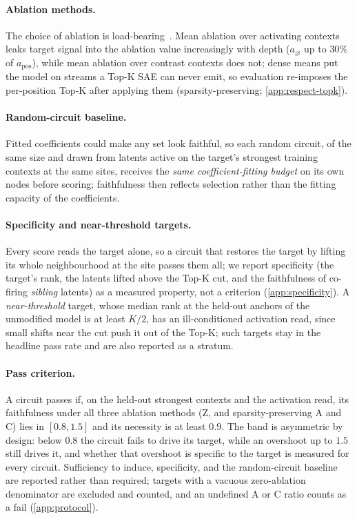 \documentclass[10pt]{article}
\begin{document}
\paragraph{Ablation methods.}
The choice of ablation is load-bearing~\citep{li2024optimal, miller2024transformer}.
Mean ablation over activating contexts leaks target signal into the ablation value increasingly with depth ($a_{\varnothing}$ up to $30\%$ of $a_{\mathrm{pos}}$), while mean ablation over contrast contexts does not; dense means put the model on streams a Top-K SAE can never emit, so evaluation re-imposes the per-position Top-K after applying them (sparsity-preserving; \cref{app:respect-topk}).

\paragraph{Random-circuit baseline.}
Fitted coefficients could make any set look faithful, so each random circuit, of the same size and drawn from latents active on the target's strongest training contexts at the same sites, receives the \emph{same coefficient-fitting budget} on its own nodes before scoring; faithfulness then reflects selection rather than the fitting capacity of the coefficients.

\paragraph{Specificity and near-threshold targets.}
Every score reads the target alone, so a circuit that restores the target by lifting its whole neighbourhood at the site passes them all; we report specificity (the target's rank, the latents lifted above the Top-K cut, and the faithfulness of co-firing \emph{sibling} latents) as a measured property, not a criterion (\cref{app:specificity}).
A \emph{near-threshold} target, whose median rank at the held-out anchors of the unmodified model is at least $K/2$, has an ill-conditioned activation read, since small shifts near the cut push it out of the Top-K; such targets stay in the headline pass rate and are also reported as a stratum.

\paragraph{Pass criterion.}
A circuit passes if, on the held-out strongest contexts and the activation read, its faithfulness under all three ablation methods (Z, and sparsity-preserving A and C) lies in $[0.8, 1.5]$ and its necessity is at least $0.9$.
The band is asymmetric by design: below $0.8$ the circuit fails to drive its target, while an overshoot up to $1.5$ still drives it, and whether that overshoot is specific to the target is measured for every circuit.
Sufficiency to induce, specificity, and the random-circuit baseline are reported rather than required; targets with a vacuous zero-ablation denominator are excluded and counted, and an undefined A or C ratio counts as a fail (\cref{app:protocol}).
\end{document}
